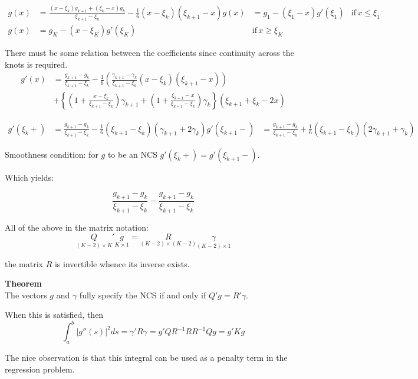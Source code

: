 \documentclass[a4paper]{article}
\newcommand{\obj}[1]{{\left\{ #1 \right \}}}
\newcommand{\brac}[1]{{\left ( #1 \right )}}
\newcommand{\abs}[1]{{\left | #1 \right |}}
\begin{document}
\begin{align*}
g(x) &= \frac{(x-\xi_k)g_{k+1} + (\xi_k-x)g_k}{\xi_{k+1}-\xi_k}
	- \frac{1}{6}(x-\xi_k)(\xi_{k+1}-x)
g(x) &= g_1 - (\xi_1-x)g'(\xi_1) & \text{if}\,x\leq \xi_1 \\
g(x) &= g_K - (x-\xi_K)g'(\xi_K) & \text{if}\,x\geq \xi_K
\end{align*}

There must be some relation between the coefficients since continuity across the knots is required.
\begin{align*}
g'(x) &= \frac{g_{k+1}-g_k}{\xi_{k+1}-\xi_k}
	-\frac{1}{6} \brac{ \frac{\gamma_{k+1}-\gamma_k}{\xi_{k+1}-\xi_k} (x-\xi_k)(\xi_{k+1}-x) }\\
	&+ \obj{
		\brac{1+\frac{x-\xi_k}{\xi_{k+1}-\xi_k}}\gamma_{k+1}
		+ \brac{1+\frac{\xi_{k+1}-x}{\xi_{k+1}-\xi_k}}\gamma_k
	} \brac{\xi_{k+1} + \xi_k - 2 x}
\end{align*}

\begin{align*}
g'(\xi_k+) &= \frac{g_{k+1}-g_k}{\xi_{k+1}-\xi_k} - \frac{1}{6} \brac{\xi_{k+1}-\xi_k}\brac{\gamma_{k+1}+2\gamma_k}
g'(\xi_{k+1}-) &=\frac{g_{k+1}-g_k}{\xi_{k+1}-\xi_k} + \frac{1}{6} \brac{\xi_{k+1}-\xi_k}\brac{2\gamma_{k+1}+\gamma_k}
\end{align*}

Smoothness condition: for $g$ to be an NCS $g'(\xi_k+)=g'(\xi_{k+1}-)$.

Which yields:

\[ \frac{g_{k+1}-g_k}{\xi_{k+1}-\xi_k} - \frac{g_{k+1}-g_k}{\xi_{k+1}-\xi_k}\]


All of the above in the matrix notation:
\[\underset{(K-2)\times K}{Q}'\underset{K\times1}{g} = \underset{(K-2)\times(K-2)}{R}\underset{(K-2)\times1}{\gamma}\]

the matrix $R$ is invertible whence its inverse exists.


\noindent\textbf{Theorem}\hfill \\
The vectors $g$ and $\gamma$ fully specify the NCS if and only if $Q'g = R'\gamma$.

When this is satisfied, then 
\[\int_a^b \abs{g''(s)}^2 ds = \gamma' R \gamma = g' Q R^{-1} R R^{-1} Q g = g' K g\]

The nice observation is that this integral can be used as a penalty term in the regression problem.
\end{document}

